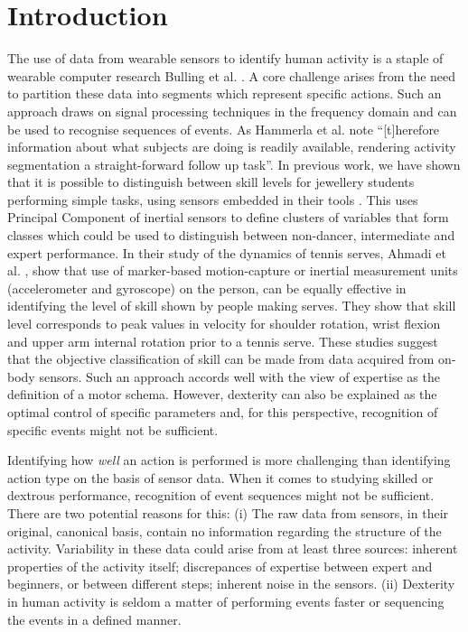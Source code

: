 \documentclass{sigchi}
\begin{document}
\section{Introduction}

The use of data from wearable sensors to identify human activity is a staple of wearable computer research Bulling et al. \cite{Bulling2014}. 
A core challenge arises from the need to partition these data into segments which represent specific actions. 
Such an approach draws on signal processing techniques in the frequency domain and can
be used to recognise sequences of events.  As Hammerla et al. \cite{Hammerla2011}
note ``[t]herefore information about what subjects are doing is readily available, rendering activity 
segmentation a straight-forward follow up task''. 
In previous work, we have shown that it is possible to distinguish between skill levels for jewellery 
students performing simple tasks, using sensors embedded in their tools \cite{RefXXX}.
This uses Principal Component of inertial sensors to define clusters of variables that form classes 
which could be used to distinguish between non-dancer, intermediate and expert performance.
In their study of the dynamics of tennis serves,  Ahmadi et al. \cite{Ahmadi2010}, 
show that use of marker-based motion-capture or inertial measurement units (accelerometer and gyroscope) 
on the person, can be equally effective in identifying the level of skill shown by people making serves.
They show that skill level corresponds to peak values in velocity for shoulder rotation, 
wrist flexion and upper arm internal rotation prior to a tennis serve. These studies suggest that the objective 
classification of skill can be made from data acquired from on-body sensors. 
Such an approach accords well with the view of expertise as the definition of a motor schema. %
However, dexterity can also be explained as the optimal control of specific parameters and, for this perspective, 
recognition of specific events might not be sufficient. 


Identifying how \textit{well} an action is performed is more challenging than identifying action type
on the basis of sensor data.
When it comes to studying skilled or dextrous performance, recognition of event sequences
might not be sufficient. 
There are two potential reasons for this:
(i) The raw data from sensors, in their original, canonical basis, contain no information regarding the structure of
the activity. Variability in these data could arise from at least three sources:
inherent properties of the activity itself;
discrepances of expertise between expert and beginners, or between different steps;
inherent noise in the sensors.
(ii) Dexterity in human activity is seldom a matter of performing events 
faster or sequencing the events in a defined manner. 
\end{document}
